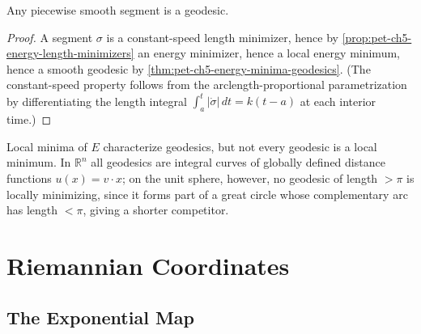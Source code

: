 \begin{corollary}
  \label{cor:pet-ch5-segments-are-geodesics}
  \leanok
  Any piecewise smooth segment is a geodesic.
\end{corollary}
\begin{proof}
  \leanok
  A segment $\sigma$ is a constant-speed length minimizer, hence by
  \cref{prop:pet-ch5-energy-length-minimizers} an energy minimizer, hence a local
  energy minimum, hence a smooth geodesic by
  \cref{thm:pet-ch5-energy-minima-geodesics}. (The constant-speed property follows
  from the arclength-proportional parametrization by differentiating the length
  integral $\int_a^t|\dot\sigma|\,dt=k(t-a)$ at each interior time.)
\end{proof}

\begin{remark}
  \label{rem:pet-ch5-sphere-not-locally-minimizing}
  Local minima of $E$ characterize geodesics, but not every geodesic is a local
  minimum. In $\mathbb R^n$ all geodesics are integral curves of globally defined
  distance functions $u(x)=v\cdot x$; on the unit sphere, however, no geodesic of
  length $>\pi$ is locally minimizing, since it forms part of a great circle whose
  complementary arc has length $<\pi$, giving a shorter competitor.
\end{remark}

\section{Riemannian Coordinates}

\subsection{The Exponential Map}

